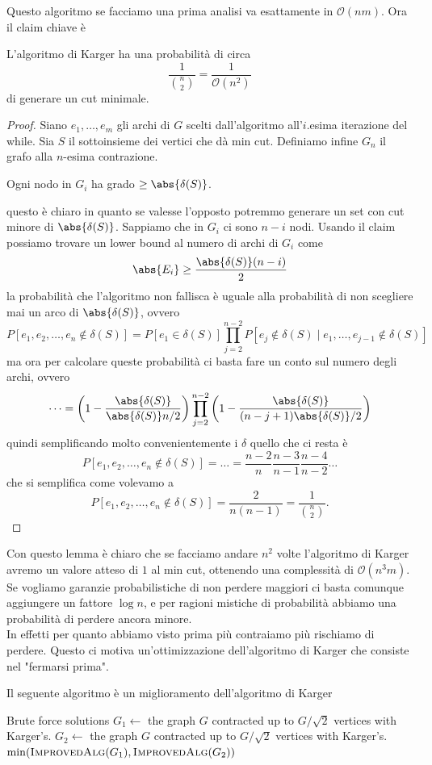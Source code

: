 \documentclass[11pt]{scrartcl}
\newcommand{\bigo}{\mathcal{O}}
\begin{document}
	Questo algoritmo se facciamo una prima analisi va esattamente in $\bigo(nm)$.
	Ora il claim chiave è
	\begin{lemma}
		L'algoritmo di Karger ha una probabilità di circa
		$$\frac{1}{\binom{n}{2}}= \frac{1}{\bigo\!\left(n^2\right)}$$
		di generare un cut minimale.
	\end{lemma}
	\begin{proof}
		Siano $e_1,\dots,e_m$ gli archi di $G$ scelti dall'algoritmo all'$i$.esima iterazione del while. Sia $S$ il sottoinsieme dei vertici che dà min cut. Definiamo infine $G_n$ il grafo alla $n$-esima contrazione.
		\begin{claim}
			Ogni nodo in $G_i$ ha grado $\ge\abs{\delta(S)}$.
		\end{claim}
		questo è chiaro in quanto se valesse l'opposto potremmo generare un set con cut minore di $\abs{\delta(S)}$. Sappiamo che in $G_i$ ci sono $n-i$ nodi. Usando il claim possiamo trovare un lower bound al numero di archi di $G_i$ come
		$$\abs{E_i}\ge \frac{\abs{\delta(S)}(n-i)}{2}$$
		la probabilità che l'algoritmo non fallisca è uguale alla probabilità di non scegliere mai un arco di $\abs{\delta(S)}$, ovvero
		$$P[e_1,e_2,\dots,e_n\not\in \delta(S)]=P[e_1\in \delta(S)]\prod_{j=2}^{n-2}P[e_j\not\in \delta(S)\mid e_1,\dots,e_{j-1}\not\in \delta(S)]$$
		ma ora per calcolare queste probabilità ci basta fare un conto sul numero degli archi, ovvero
		$$\dots=\left(1-\frac{\abs{\delta(S)}}{\abs{\delta(S)}n/2}\right)\prod_{j=2}^{n-2}\left(1-\frac{\abs{\delta(S)}}{(n-j+1)\abs{\delta(S)}/2}\right)$$
		quindi semplificando molto convenientemente i $\delta$ quello che ci resta è
		$$P[e_1,e_2,\dots,e_n\not\in \delta(S)]=\dots=\frac{n-2}{n}\frac{n-3}{n-1}\frac{n-4}{n-2}\dots$$
		che si semplifica come volevamo a
		$$P[e_1,e_2,\dots,e_n\not\in \delta(S)]=\frac{2}{n(n-1)}=\frac{1}{\binom{n}{2}}.$$
	\end{proof}
	Con questo lemma è chiaro che se facciamo andare $n^2$ volte l'algoritmo di Karger avremo un valore atteso di $1$ al min cut, ottenendo una complessità di $\bigo(n^3m)$. Se vogliamo garanzie probabilistiche di non perdere maggiori ci basta comunque aggiungere un fattore $\log n$, e per ragioni mistiche di probabilità abbiamo una probabilità di perdere ancora minore. \\
	In effetti per quanto abbiamo visto prima più contraiamo più rischiamo di perdere. Questo ci motiva un'ottimizzazione dell'algoritmo di Karger che consiste nel "fermarsi prima".
	\begin{algorithm}
		Il seguente algoritmo è un miglioramento dell'algoritmo di Karger
		\begin{algorithmic}[1]
					\State Brute force 
					\State \Return solutions
				\Else
					\State $G_1\gets$ the graph $G$ contracted up to $G/\sqrt{2}$ vertices with Karger's. 
					\State $G_2\gets$ the graph $G$ contracted up to $G/\sqrt{2}$ vertices with Karger's.
					\State \Return $\min(\Call{ImprovedAlg}{G_1},\Call{ImprovedAlg}{G_2})$
				\EndIf
			\EndFunction
		\end{algorithmic}
	\end{algorithm}
\end{document}
